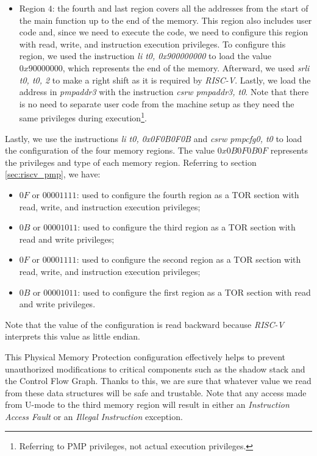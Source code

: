 \begin{itemize}
  \item Region $4$: the fourth and last region covers all the addresses from the
    start of the main function up to the end of the memory. This region also includes
    user code and, since we need to execute the code, we need to configure this region
    with read, write, and instruction execution privileges. To configure this
    region, we used the instruction \textit{li t0, 0x900000000} to load the
    value $0x90000000$, which represents the end of the memory. Afterward, we used
    \textit{srli t0, t0, 2} to make a right shift as it is required by \textit{RISC-V}.
    Lastly, we load the address in \textit{pmpaddr3} with the instruction
    \textit{csrw pmpaddr3, t0}. Note that there is no need to separate user code
    from the machine setup as they need the same privileges during execution\footnote{Referring
    to PMP privileges, not actual execution privileges.}.
\end{itemize}

Lastly, we use the instructions \textit{li t0, 0x0F0B0F0B} and \textit{csrw
pmpcfg0, t0} to load the configuration of the four memory regions. The value
$0x0 B0F0B0F$ represents the privileges and type of each memory region. Referring
to section \ref{sec:riscv_pmp}, we have:
\begin{itemize}
  \item $0F$ or $00001111$: used to configure the fourth region as a TOR section
    with read, write, and instruction execution privileges;

  \item $0B$ or $00001011$: used to configure the third region as a TOR section
    with read and write privileges;

  \item $0F$ or $00001111$: used to configure the second region as a TOR section
    with read, write, and instruction execution privileges;

  \item $0B$ or $00001011$: used to configure the first region as a TOR section
    with read and write privileges.
\end{itemize}

Note that the value of the configuration is read backward because \textit{RISC-V}
interprets this value as little endian.

This Physical Memory Protection configuration effectively helps to prevent unauthorized
modifications to critical components such as the shadow stack and the Control Flow
Graph. Thanks to this, we are sure that whatever value we read from these data structures
will be safe and trustable. Note that any access made from U-mode to the third
memory region will result in either an \textit{Instruction Access Fault} or an \textit{Illegal
Instruction} exception.

